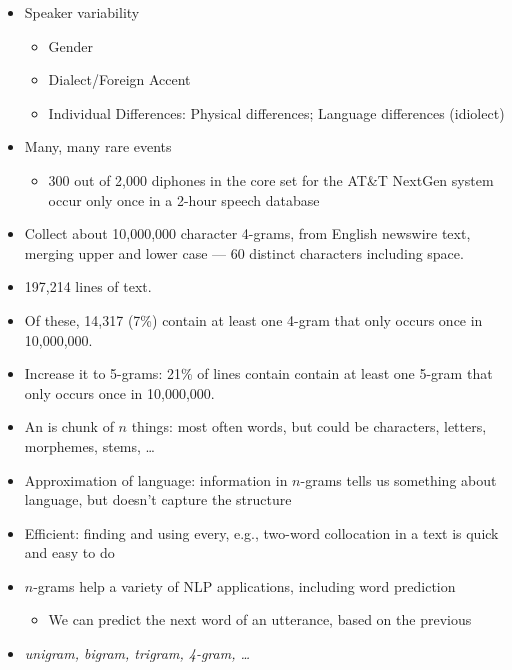 \documentclass[a4paper,landscape,headrule,footrule,xetex]{foils}
\begin{document}
\begin{itemize}
\item Speaker variability
  \begin{itemize}
  \item Gender
  \item Dialect/Foreign Accent
  \item Individual Differences: Physical differences; Language differences (idiolect)‏
  \end{itemize}
\item Many, many rare events
  \begin{itemize}
  \item 300 out of 2,000 diphones in the core set for the AT\&T NextGen system occur only once in a 2-hour speech database
  \end{itemize}
\end{itemize}
\begin{itemize}
\item Collect about 10,000,000 character 4-grams, from English
  newswire text, merging upper and lower case — 60 distinct characters
  including space.
\item 197,214 lines of text.
\item Of these, 14,317 (7\%) contain at least one 4-gram that only occurs once in 10,000,000.
\item Increase it to 5-grams: 21\% of lines contain contain at least
  one 5-gram that only occurs once in 10,000,000.
\end{itemize}

\begin{itemize}
\item An  is chunk of $n$ things: most often words, but could
  be characters, letters, morphemes, stems, \ldots
 \item Approximation of language: information in $n$-grams tells us something about language, but doesn't capture the structure
 \item Efficient: finding and using every, e.g., two-word collocation in a text is quick and easy to do
 \item $n$-grams help a variety of NLP applications, including word prediction
   \begin{itemize}
   \item We can predict the next word of an utterance, based on the previous 
   \end{itemize}
 \item \textit{unigram, bigram, trigram, 4-gram, \ldots}
\end{itemize}
\end{document}
